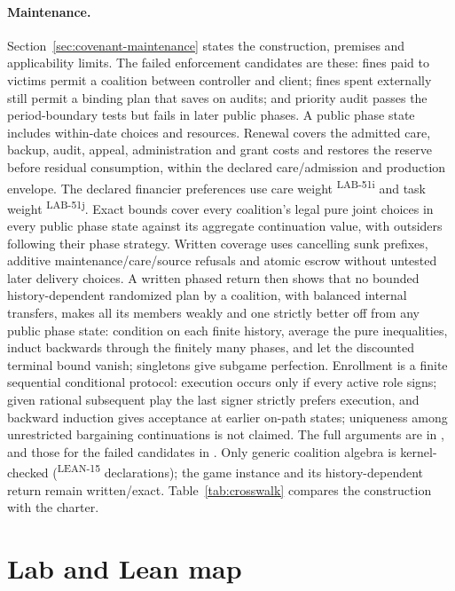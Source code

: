 \documentclass[pdflatex,sn-basic]{sn-jnl}%
\newcommand{\rec}[1]{\ifannotated\textsuperscript{\textcolor{blue!60!black}{\tiny#1}}\fi}
\begin{document}
\begin{appendices}
\paragraph{Maintenance.} Section~\ref{sec:covenant-maintenance} states the construction, premises and applicability limits. The failed enforcement candidates are these: fines paid to victims permit a coalition between controller and client; fines spent externally still permit a binding plan that saves on audits; and priority audit passes the period-boundary tests but fails in later public phases. A public phase state includes within-date choices and resources. Renewal covers the admitted care, backup, audit, appeal, administration and grant costs and restores the reserve before residual consumption, within the declared care/admission and production envelope. The declared financier preferences use care weight \numDTwentyCareWeight\rec{LAB-51i} and task weight \numDTwentyTaskWeight\rec{LAB-51j}. Exact bounds cover every coalition's legal pure joint choices in every public phase state against its aggregate continuation value, with outsiders following their phase strategy. Written coverage uses cancelling sunk prefixes, additive maintenance/care/source refusals and atomic escrow without untested later delivery choices. A written phased return then shows that no bounded history-dependent randomized plan by a coalition, with balanced internal transfers, makes all its members weakly and one strictly better off from any public phase state: condition on each finite history, average the pure inequalities, induct backwards through the finitely many phases, and let the discounted terminal bound vanish; singletons give subgame perfection. Enrollment is a finite sequential conditional protocol: execution occurs only if every active role signs; given rational subsequent play the last signer strictly prefers execution, and backward induction gives acceptance at earlier on-path states; uniqueness among unrestricted bargaining continuations is not claimed. The full arguments are in , and those for the failed candidates in . Only generic coalition algebra is kernel-checked (\numLeanCoalitions\rec{LEAN-15} declarations); the game instance and its history-dependent return remain written/exact. Table~\ref{tab:crosswalk} compares the construction with the charter.

\FloatBarrier%

\section{Lab and Lean map}\label{app:lean}


\end{appendices}
\end{document}
